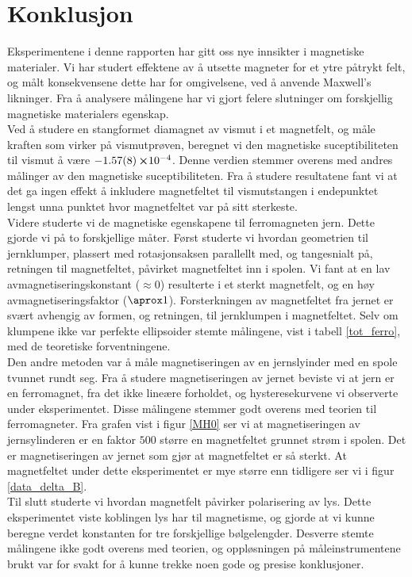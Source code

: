 \documentclass[%
 reprint,
 amsmath,amssymb,
 aps,
 norsk,
]{revtex4-1}
\begin{document}
\section{Konklusjon}
Eksperimentene i denne rapporten har gitt oss nye innsikter i magnetiske materialer. Vi har studert effektene av å utsette magneter for et ytre påtrykt felt, og målt konsekvensene dette har for omgivelsene, ved å anvende Maxwell's likninger. Fra å analysere målingene har vi gjort felere slutninger om forskjellig magnetiske materialers egenskap.\\
Ved å studere en stangformet diamagnet av vismut i et magnetfelt, og måle kraften som virker på vismutprøven, beregnet vi den magnetiske suceptibiliteten til vismut å være $-\SI{1.57\pm0.08}\cross 10^{-4}$. Denne verdien stemmer overens med andres målinger av den magnetiske suceptibiliteten. Fra å studere resultatene fant vi at det ga ingen effekt å inkludere magnetfeltet til vismutstangen i endepunktet lengst unna punktet hvor magnetfeltet var på sitt sterkeste.\\
Videre studerte vi de magnetiske egenskapene til ferromagneten jern. Dette gjorde vi på to forskjellige måter. Først studerte vi hvordan geometrien til jernklumper, plassert med rotasjonsaksen parallellt med, og tangesnialt på, retningen til magnetfeltet, påvirket magnetfeltet inn i spolen. Vi fant at en lav avmagnetiseringskonstant ($\approx 0$) resulterte i et sterkt magnetfelt, og en høy avmagnetiseringsfaktor ($\aprox 1$). Forsterkningen av magnetfeltet fra jernet er svært avhengig av formen, og retningen, til jernklumpen i magnetfeltet. Selv om klumpene ikke var perfekte ellipsoider stemte målingene, vist i tabell \vref{tot_ferro}, med de teoretiske forventningene.\\
Den andre metoden var å måle magnetiseringen av en jernslyinder med en spole tvunnet rundt seg. Fra å studere magnetiseringen av jernet beviste vi at jern er en ferromagnet, fra det ikke lineære forholdet, og hysteresekurvene vi observerte under eksperimentet. Disse målingene stemmer godt overens med teorien til ferromagneter. Fra grafen vist i figur \vref{MH0} ser vi at magnetiseringen av jernsylinderen er en faktor $500$ større en magnetfeltet grunnet strøm i spolen. Det er magnetiseringen av jernet som gjør at magnetfeltet er så sterkt. At magnetfeltet under dette eksperimentet er mye større enn tidligere ser vi i figur \vref{data_delta_B}. \\
Til slutt studerte vi hvordan magnetfelt påvirker polarisering av lys. Dette eksperimentet viste koblingen lys har til magnetisme, og gjorde at vi kunne beregne verdet konstanten for tre forskjellige bølgelengder. Desverre stemte målingene ikke godt overens med teorien, og oppløsningen på måleinstrumentene brukt var for svakt for å kunne trekke noen gode og presise konklusjoner.
{}

\end{document}
